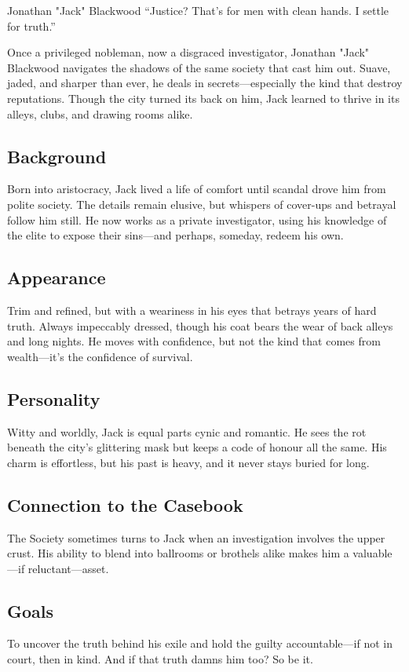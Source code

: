 \begin{WyrdCharacterSheet}
    {Jonathan "Jack" Blackwood} 
    {“Justice? That’s for men with clean hands. I settle for truth.”}
    \label{pc:jack-blackwood}

    Once a privileged nobleman, now a disgraced investigator, Jonathan "Jack" Blackwood navigates the shadows of the same society that cast him out. Suave, jaded, and sharper than ever, he deals in secrets—especially the kind that destroy reputations. Though the city turned its back on him, Jack learned to thrive in its alleys, clubs, and drawing rooms alike.

    \subsection{Background}
    Born into aristocracy, Jack lived a life of comfort until scandal drove him from polite society. The details remain elusive, but whispers of cover-ups and betrayal follow him still. He now works as a private investigator, using his knowledge of the elite to expose their sins—and perhaps, someday, redeem his own.

    \subsection{Appearance}
    Trim and refined, but with a weariness in his eyes that betrays years of hard truth. Always impeccably dressed, though his coat bears the wear of back alleys and long nights. He moves with confidence, but not the kind that comes from wealth—it’s the confidence of survival.

    \subsection{Personality}
    Witty and worldly, Jack is equal parts cynic and romantic. He sees the rot beneath the city’s glittering mask but keeps a code of honour all the same. His charm is effortless, but his past is heavy, and it never stays buried for long.

    \subsection{Connection to the Casebook}
    The Society sometimes turns to Jack when an investigation involves the upper crust. His ability to blend into ballrooms or brothels alike makes him a valuable—if reluctant—asset.

    \subsection{Goals}
    To uncover the truth behind his exile and hold the guilty accountable—if not in court, then in kind. And if that truth damns him too? So be it.


\end{WyrdCharacterSheet}
